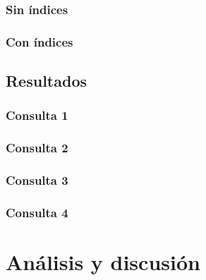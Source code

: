 \subsubsection{Sin índices}
\subsubsection{Con índices}

\subsection{Resultados}
\subsubsection{Consulta 1}
\subsubsection{Consulta 2}
\subsubsection{Consulta 3}
\subsubsection{Consulta 4}

\section{Análisis y discusión}